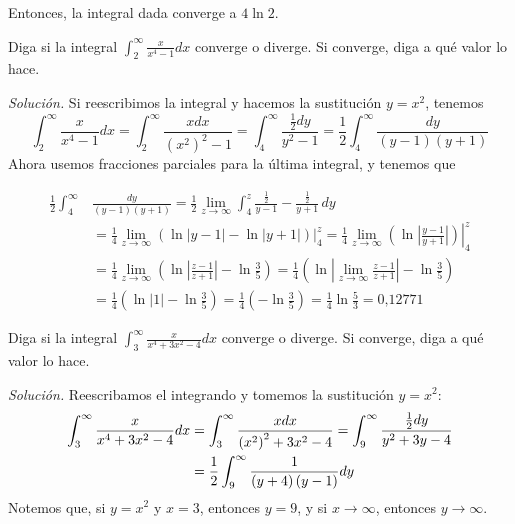 Entonces, la integral dada converge a $4\ln 2.$

\begin{ejemplo}
\textnormal{Diga si la integral \textit{$\displaystyle\int_{2}^{\infty }\frac{x}{x^{4}-1}dx$} converge o diverge. Si converge, diga a qué valor lo hace.}
\end{ejemplo}
\textit{Solución.} Si reescribimos la integral y hacemos la sustitución $y=x^2$, tenemos
\[
\int_{2}^{\infty }\frac{x}{x^{4}-1}dx=\int_{2}^{\infty }\frac{xdx}{\left(
x^{2}\right) ^{2}-1}=\int_{4}^{\infty }\frac{\frac{1}{2}dy}{y^{2}-1}
=\frac{1}{2}\int_{4}^{\infty }\frac{dy}{\left( y-1\right) \left( y+1\right)}
\]
Ahora usemos fracciones parciales para la última integral, y tenemos que

\begin{align*}
\frac{1}{2}\int_{4}^{\infty }&\frac{dy}{\left( y-1\right) \left( y+1\right)} =\frac{1}{2}\lim_{z\rightarrow \infty }\int_{4}^{z} \frac{\frac{1}{2}}{y-1}-\frac{\frac{1}{2}}{y+1}\, dy \\
&=\frac{1}{4}\lim_{z\rightarrow \infty }\left( \ln \left\vert y-1\right\vert
-\ln \left\vert y+1\right\vert \right)\big\vert_{4}^{z} %
=\frac{1}{4}\left.\lim_{z\rightarrow \infty }\left( \ln \left\vert \frac{y-1}{y+1}\right\vert \right)\right\vert_{4}^{z} \\
&=\frac{1}{4}\lim_{z\rightarrow \infty }\left( \ln \left\vert \frac{z-1}{z+1}%
\right\vert -\ln \frac{3}{5}\right) %
=\frac{1}{4}\left( \ln \left\vert \lim_{z\rightarrow \infty }\frac{z-1}{z+1}%
\right\vert -\ln \frac{3}{5}\right) \\
&=\frac{1}{4}\left( \ln \left\vert 1\right\vert -\ln \frac{3}{5}\right) =%
\frac{1}{4}\left( -\ln \frac{3}{5}\right) %
=\frac{1}{4}\ln \frac{5}{3}=0\text{,}12771
\end{align*}

\begin{ejemplo}
\textnormal{Diga si la integral \textit{$\displaystyle \int_{3}^{\infty}\frac{x}{x^{4}+3x^{2}-4}dx$} converge o diverge. Si converge, diga a qué valor lo hace.}
\end{ejemplo}
\textit{Solución.} Reescribamos el integrando y tomemos la sustitución $y=x^2$:
\begin{align*}
\int_{3}^{\infty}\frac{x}{x^{4}+3x^{2}-4}dx&=\int_{3}^{\infty }\frac{xdx}{%
\left( x^{2}\right) ^{2}+3x^{2}-4}
=\int_{9}^{\infty }\frac{\frac{1}{2}dy}{y^{2}+3y-4} \\
&=\frac{1}{2}%
\int_{9}^{\infty }\frac{1}{\left( y+4\right) \left( y-1\right) }dy
\end{align*}
Notemos que, si $y=x^2$ y $x=3$, entonces $y=9$, y si $x\to\infty$, entonces $y\to\infty$.

